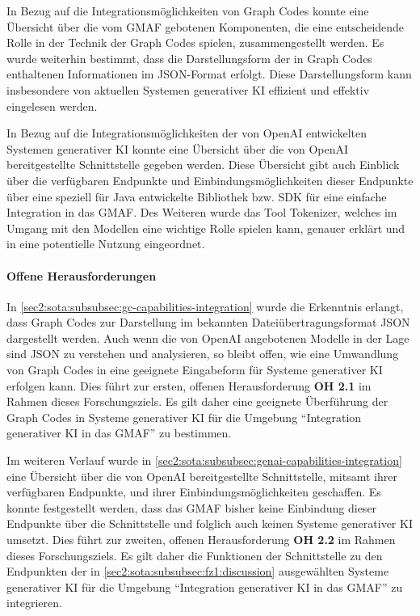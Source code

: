 In Bezug auf die Integrationsmöglichkeiten von Graph Codes konnte eine Übersicht über die vom GMAF gebotenen Komponenten, die eine entscheidende Rolle in der Technik der Graph Codes spielen, zusammengestellt werden.
Es wurde weiterhin bestimmt, dass die Darstellungsform der in Graph Codes enthaltenen Informationen im JSON-Format erfolgt.
Diese Darstellungsform kann insbesondere von aktuellen Systemen generativer KI effizient und effektiv eingelesen werden.

In Bezug auf die Integrationsmöglichkeiten der von OpenAI entwickelten Systemen generativer KI konnte eine Übersicht über die von OpenAI bereitgestellte Schnittstelle gegeben werden.
Diese Übersicht gibt auch Einblick über die verfügbaren Endpunkte und Einbindungsmöglichkeiten dieser Endpunkte über eine speziell für Java entwickelte Bibliothek bzw. SDK für eine einfache Integration in das GMAF.
Des Weiteren wurde das Tool Tokenizer, welches im Umgang mit den Modellen eine wichtige Rolle spielen kann, genauer erklärt und in eine potentielle Nutzung eingeordnet.

\paragraph{Offene Herausforderungen}
\label{sec2:sota:par:fz2:open-challenges}
In \cref{sec2:sota:subsubsec:gc-capabilities-integration} wurde die Erkenntnis erlangt, dass Graph Codes zur Darstellung im bekannten Dateiübertragungsformat JSON dargestellt werden.
Auch wenn die von OpenAI angebotenen Modelle in der Lage sind JSON zu verstehen und analysieren, so bleibt offen, wie eine Umwandlung von Graph Codes in eine geeignete Eingabeform für Systeme generativer KI erfolgen kann.
Dies führt zur ersten, offenen Herausforderung \textbf{OH 2.1} im Rahmen dieses Forschungsziels.
Es gilt daher eine geeignete Überführung der Graph Codes in Systeme generativer KI für die Umgebung \enquote{Integration generativer KI in das GMAF} zu bestimmen.

Im weiteren Verlauf wurde in \cref{sec2:sota:subsubsec:genai-capabilities-integration} eine Übersicht über die von OpenAI bereitgestellte Schnittstelle, mitsamt ihrer verfügbaren Endpunkte, und ihrer Einbindungsmöglichkeiten geschaffen.
Es konnte festgestellt werden, dass das GMAF bisher keine Einbindung dieser Endpunkte über die Schnittstelle und folglich auch keinen Systeme generativer KI umsetzt.
Dies führt zur zweiten, offenen Herausforderung \textbf{OH 2.2} im Rahmen dieses Forschungsziels.
Es gilt daher die Funktionen der Schnittstelle zu den Endpunkten der in \cref{sec2:sota:subsubsec:fz1:discussion} ausgewählten Systeme generativer KI für die Umgebung \enquote{Integration generativer KI in das GMAF} zu integrieren.

